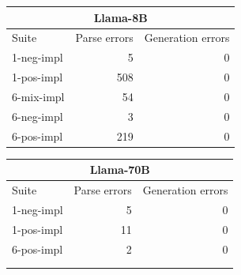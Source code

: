 \begin{table}
    \centering
    \scriptsize

    \begin{tabular}{lrr}
    \toprule
    \multicolumn{3}{c}{\textbf{Llama-8B}} \\
    \midrule
    Suite & Parse errors & Generation errors \\
    \midrule
    1-neg-impl & 5 & 0 \\
    1-pos-impl & 508 & 0 \\
    6-mix-impl & 54 & 0 \\
    6-neg-impl & 3 & 0 \\
    6-pos-impl & 219 & 0 \\
    \bottomrule
    \end{tabular}
    \quad
    \begin{tabular}{lrr}
    \toprule
    \multicolumn{3}{c}{\textbf{Llama-70B}} \\
    \midrule
    Suite & Parse errors & Generation errors \\
    \midrule
    1-neg-impl & 5 & 0 \\
    1-pos-impl & 11 & 0 \\
    6-pos-impl & 2 & 0 \\
    & & \\
    & & \\
    \bottomrule
    \end{tabular}
    
    \quad
    

\end{table}
